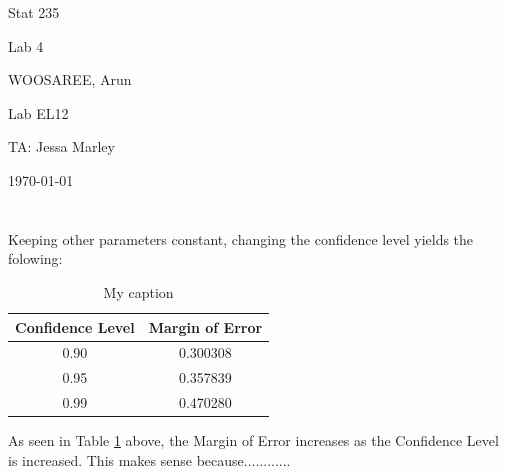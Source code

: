 \documentclass[letterpaper]{article}
\begin{document}
\begin{titlepage}
 \begin{center}
  \vspace*{1cm}
  \Huge
  Stat 235
  \vspace{1cm}
  
  Lab 4
  \vspace{1cm}
  
  WOOSAREE, Arun
  \vspace{1cm}
  
  \Huge
  Lab EL12
  \vspace{1cm}
  
  TA: Jessa Marley
  \vspace{1cm}
  
  \today
  \vfill
 \end{center}
\end{titlepage}

\section{}%

\subsection{}%
Keeping other parameters constant, changing the confidence level yields the folowing:
\begin{table}[H]
 \centering
 \begin{tabular}{|c|c|}
  \hline
  Confidence Level & Margin of Error \\ \hline
  0.90             & 0.300308        \\ \hline
  0.95             & 0.357839        \\ \hline
  0.99             & 0.470280        \\ \hline
 \end{tabular}
 \caption{My caption}
 \label{1a}
\end{table}
As seen in Table \ref{1a} above, the Margin of Error increases as the
Confidence Level is increased. This makes sense because............


\subsection{}%
\end{document}
